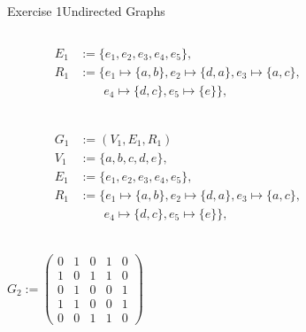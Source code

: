 \begin{frame}[allowframebreaks]{Exercise 1}{Undirected Graphs}
\begin{solutionnoinc}
\begin{columns}
\begin{column}{0.6\textwidth}
\begin{align*}
          E_1 &:= \{e_1, e_2, e_3, e_4, e_5\},\\
          R_1 &:= \{e_1 \mapsto \{a, b\} , e_2 \mapsto \{d, a\}, e_3 \mapsto \{a, c\},\\\ & \qquad e_4 \mapsto \{d, c\}, e_5 \mapsto \{e\}\},\\
        \end{align*}
      \end{column}
      \begin{column}{0.4\textwidth}
      \end{column}
    \end{columns}
  \end{solutionnoinc}
  \begin{solutionnoinc}
    \begin{columns}
      \begin{column}{0.6\textwidth}
        \centering
        \begin{align*}
          G_1 &:= (V_1, E_1, R_1)\\
          V_1 &:= \{a, b, c, d, e\},\\
          E_1 &:= \{e_1, e_2, e_3, e_4, e_5\},\\
          R_1 &:= \{e_1 \mapsto \{a, b\} , e_2 \mapsto \{d, a\}, e_3 \mapsto \{a, c\},\\\ & \qquad e_4 \mapsto \{d, c\}, e_5 \mapsto \{e\}\},\\
        \end{align*}
      \end{column}
      \begin{column}{0.4\textwidth}
      \end{column}
    \end{columns}
  \end{solutionnoinc}
  \begin{solutionnoinc}
    \begin{columns}
      \begin{column}{0.5\textwidth}
        \centering
        $G_2 :=
        \begin{pmatrix}
        0 & 1 & 0 & 1 & 0 \\
        1 & 0 & 1 & 1 & 0 \\
        0 & 1 & 0 & 0 & 1 \\
        1 & 1 & 0 & 0 & 1 \\
        0 & 0 & 1 & 1 & 0
        \end{pmatrix}$
      \end{column}

\end{columns}
\end{solutionnoinc}
\end{frame}
